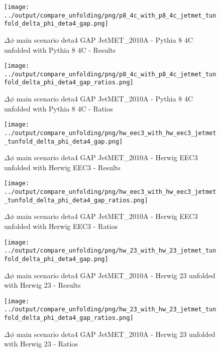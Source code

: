 \documentclass[11pt]{book}
\begin{document}
\begin{figure}[ht]
\centering
\texttt{[image: ../output/compare\_unfolding/png/p8\_4c\_with\_p8\_4c\_jetmet\_tunfold\_delta\_phi\_deta4\_gap.png]}
\caption{$\Delta\phi$ main scenario deta4 GAP JetMET\_2010A - Pythia 8 4C unfolded with Pythia 8 4C - Results}
\label{p8_p8_jetmet_tunfold_delta_phi_deta4_gap_a}
\end{figure}

\begin{figure}[ht]
\centering
\texttt{[image: ../output/compare\_unfolding/png/p8\_4c\_with\_p8\_4c\_jetmet\_tunfold\_delta\_phi\_deta4\_gap\_ratios.png]}
\caption{$\Delta\phi$ main scenario deta4 GAP JetMET\_2010A - Pythia 8 4C unfolded with Pythia 8 4C - Ratios}
\label{p8_p8_jetmet_tunfold_delta_phi_deta4_gap_b}
\end{figure}

\begin{figure}[ht]
\centering
\texttt{[image: ../output/compare\_unfolding/png/hw\_eec3\_with\_hw\_eec3\_jetmet\_tunfold\_delta\_phi\_deta4\_gap.png]}
\caption{$\Delta\phi$ main scenario deta4 GAP JetMET\_2010A - Herwig EEC3 unfolded with Herwig EEC3 - Results}
\label{hw_eec3_hw_eec3_jetmet_tunfold_delta_phi_deta4_gap_a}
\end{figure}

\begin{figure}[ht]
\centering
\texttt{[image: ../output/compare\_unfolding/png/hw\_eec3\_with\_hw\_eec3\_jetmet\_tunfold\_delta\_phi\_deta4\_gap\_ratios.png]}
\caption{$\Delta\phi$ main scenario deta4 GAP JetMET\_2010A - Herwig EEC3 unfolded with Herwig EEC3 - Ratios}
\label{hw_eec3_hw_eec3_jetmet_tunfold_delta_phi_deta4_gap_b}
\end{figure}

\begin{figure}[ht]
\centering
\texttt{[image: ../output/compare\_unfolding/png/hw\_23\_with\_hw\_23\_jetmet\_tunfold\_delta\_phi\_deta4\_gap.png]}
\caption{$\Delta\phi$ main scenario deta4 GAP JetMET\_2010A - Herwig 23 unfolded with Herwig 23 - Results}
\label{hw_23_hw_23_jetmet_tunfold_delta_phi_deta4_gap_a}
\end{figure}

\begin{figure}[ht]
\centering
\texttt{[image: ../output/compare\_unfolding/png/hw\_23\_with\_hw\_23\_jetmet\_tunfold\_delta\_phi\_deta4\_gap\_ratios.png]}
\caption{$\Delta\phi$ main scenario deta4 GAP JetMET\_2010A - Herwig 23 unfolded with Herwig 23 - Ratios}
\label{hw_23_hw_23_jetmet_tunfold_delta_phi_deta4_gap_b}
\end{figure}
\end{document}
